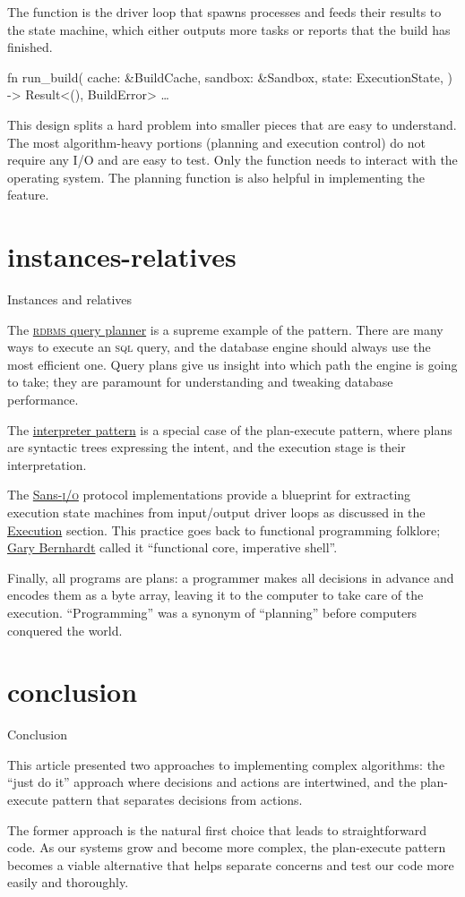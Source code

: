 \documentclass{article}
\begin{document}
The  function is the driver loop that spawns processes and feeds their results to the state machine, which either outputs more tasks or reports that the build has finished.

\begin{code}[rust]
fn run_build(
    cache: &BuildCache,
    sandbox: &Sandbox,
    state: ExecutionState,
) -> Result<(), BuildError> { \ldots  }
\end{code}

This design splits a hard problem into smaller pieces that are easy to understand.
The most algorithm-heavy portions (planning and execution control) do not require any I/O and are easy to test.
Only the  function needs to interact with the operating system.
The planning function is also helpful in implementing the  feature.

\section{instances-relatives}{Instances and relatives}

The \href{https://en.wikipedia.org/wiki/Query_plan}{\textsc{rdbms} query planner} is a supreme example of the pattern.
There are many ways to execute an \textsc{sql} query, and the database engine should always use the most efficient one.
Query plans give us insight into which path the engine is going to take; they are paramount for understanding and tweaking database performance.

The \href{https://en.wikipedia.org/wiki/Interpreter_pattern}{interpreter pattern} is a special case of the plan-execute pattern,
where plans are syntactic trees expressing the intent,
and the execution stage is their interpretation.

The \href{https://sans-io.readthedocs.io/how-to-sans-io.html}{Sans-\textsc{i/o}} protocol implementations provide a blueprint for extracting execution state machines from input/output driver loops
as discussed in the \href{#execution}{Execution} section.
This practice goes back to functional programming folklore;
\href{https://www.destroyallsoftware.com/talks/boundaries}{Gary Bernhardt} called it ``functional core, imperative shell''.

Finally, all programs are plans: a programmer makes all decisions in advance and encodes them as a byte array,
leaving it to the computer to take care of the execution.
``Programming'' was a synonym of ``planning'' before computers conquered the world.

\section{conclusion}{Conclusion}

This article presented two approaches to implementing complex algorithms:
the ``just do it'' approach where decisions and actions are intertwined,
and the plan-execute pattern that separates decisions from actions.

The former approach is the natural first choice that leads to straightforward code.
As our systems grow and become more complex,
the plan-execute pattern becomes a viable alternative that helps separate concerns and test our code more easily and thoroughly.
\end{document}

